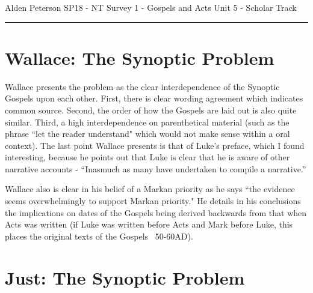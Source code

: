 \documentclass[12pt]{turabian-researchpaper}
\begin{document}
\begin{singlespace}
\noindent Alden Peterson \newline
\noindent SP18 - NT Survey 1 - Gospels and Acts\newline
\noindent Unit 5 - Scholar Track\newline
\noindent\rule{4cm}{0.4pt}
\end{singlespace}






\section{Wallace: The Synoptic Problem\autocite{wallace04}}
Wallace presents the problem as the clear interdependence of the Synoptic Gospels upon each other. First, there is clear wording agreement which indicates common source. Second, the order of how the Gospels are laid out is also quite similar. Third, a high interdependence on parenthetical material (such as the phrase ``let the reader understand" which would not make sense within a oral context). The last point Wallace presents is that of Luke's preface, which I found interesting, because he points out that Luke is clear that he is aware of other narrative accounts - ``Inasmuch as many have undertaken to compile a narrative.''

Wallace also is clear in his belief of a Markan priority as he says ``the evidence seems overwhelmingly to support Markan priority." He details in his conclusions the implications on dates of the Gospels being derived backwards from that when Acts was written (if Luke was written before Acts and Mark before Luke, this places the original texts of the Gospels ~50-60AD).

\section{Just: The Synoptic Problem\autocite{just15}}
\end{document}
